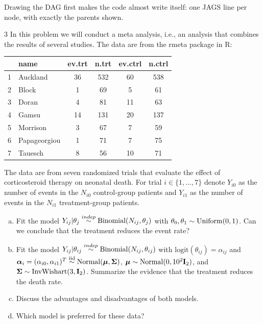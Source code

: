 \documentclass[11pt]{article}
\begin{document}
\begin{takeaway}
Drawing the DAG first makes the code almost write itself: one JAGS line per node, with exactly the parents shown.
\end{takeaway}


\begin{problem}{3}
In this problem we will conduct a meta analysis, i.e., an analysis that combines the results of several studies. The data are from the rmeta package in R:
\begin{center}
\small
\begin{tabular}{rlcccc}\toprule
 & name & ev.trt & n.trt & ev.ctrl & n.ctrl\\\midrule
1 & Auckland & 36 & 532 & 60 & 538\\
2 & Block & 1 & 69 & 5 & 61\\
3 & Doran & 4 & 81 & 11 & 63\\
4 & Gamsu & 14 & 131 & 20 & 137\\
5 & Morrison & 3 & 67 & 7 & 59\\
6 & Papageorgiou & 1 & 71 & 7 & 75\\
7 & Tauesch & 8 & 56 & 10 & 71\\\bottomrule
\end{tabular}
\end{center}
The data are from seven randomized trials that evaluate the effect of corticosteroid therapy on neonatal death. For trial $i\in\{1,\dots,7\}$ denote $Y_{i0}$ as the number of events in the $N_{i0}$ control-group patients and $Y_{i1}$ as the number of events in the $N_{i1}$ treatment-group patients.
\begin{enumerate}[(a)]
\item Fit the model $Y_{ij}|\theta_j\overset{indep}{\sim}\mathrm{Binomial}(N_{ij},\theta_j)$ with $\theta_0,\theta_1\sim\mathrm{Uniform}(0,1)$. Can we conclude that the treatment reduces the event rate?
\item Fit the model $Y_{ij}|\theta_{ij}\overset{indep}{\sim}\mathrm{Binomial}(N_{ij},\theta_{ij})$ with $\mathrm{logit}(\theta_{ij})=\alpha_{ij}$ and $\bm\alpha_i=(\alpha_{i0},\alpha_{i1})^T\stackrel{\text{iid}}{\sim}\mathrm{Normal}(\bm\mu,\bm\Sigma)$, $\bm\mu\sim\mathrm{Normal}(0,10^2\mathbf I_2)$, and $\bm\Sigma\sim\mathrm{InvWishart}(3,\mathbf I_2)$. Summarize the evidence that the treatment reduces the death rate.
\item Discuss the advantages and disadvantages of both models.
\item Which model is preferred for these data?
\end{enumerate}
\end{problem}
\end{document}
